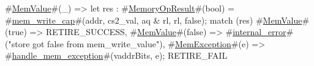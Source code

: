 {{{{        #\hyperref[sailRISCVzMemValue]{MemValue}#(_) => {
          let res : #\hyperref[sailRISCVzMemoryOpResult]{MemoryOpResult}#(bool) = #\hyperref[sailRISCVzmemzywritezycap]{mem\_write\_cap}#(addr, cs2_val, aq & rl, rl, false);
          match (res) {
            #\hyperref[sailRISCVzMemValue]{MemValue}#(true)  => RETIRE_SUCCESS,
            #\hyperref[sailRISCVzMemValue]{MemValue}#(false) => #\hyperref[sailRISCVzinternalzyerror]{internal\_error}#("store got false from mem_write_value"),
            #\hyperref[sailRISCVzMemException]{MemException}#(e) => { #\hyperref[sailRISCVzhandlezymemzyexception]{handle\_mem\_exception}#(vaddrBits, e); RETIRE_FAIL }
          }
        }
      }
    }
  }
}
